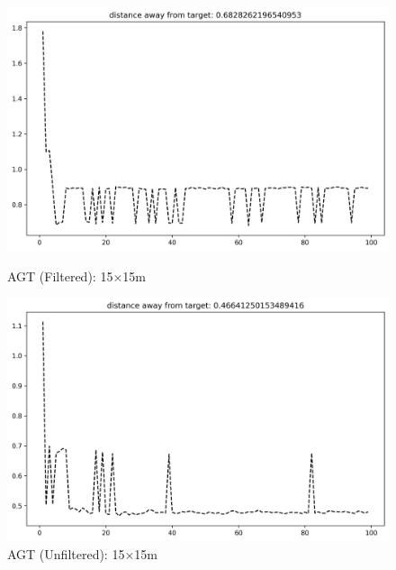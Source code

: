 \documentclass[runningheads]{llncs}
\begin{document}
\begin{figure}[H]
	\centering
	\begin{minipage}{0.49\textwidth}
		\centering
		\includegraphics[width=\textwidth]{figures/filtered/xgbrf_custom_15.png}
		\caption*{AGT (Filtered): 15×15m}
	\end{minipage}
	\hfill
	\begin{minipage}{0.49\textwidth}
		\centering
		\includegraphics[width=\textwidth]{figures/unfiltered/xgbrf_custom_15.png}
		\caption*{AGT (Unfiltered): 15×15m}
	\end{minipage}
\end{figure}
\end{document}
